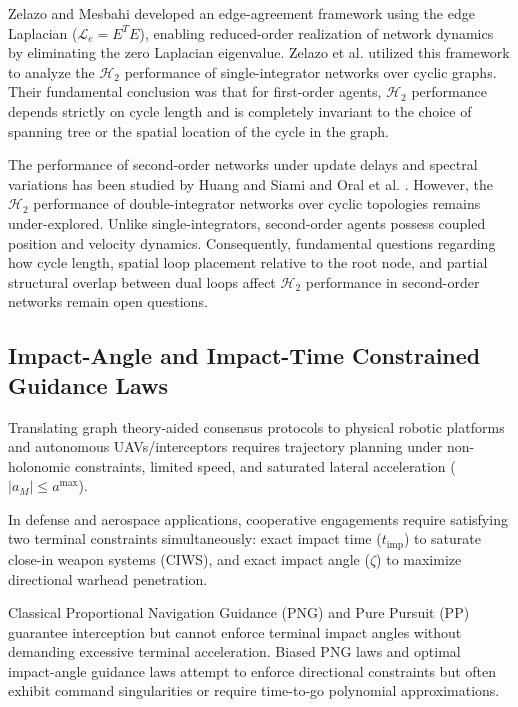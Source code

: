 Zelazo and Mesbahi \cite{zelazo2010edge} developed an edge-agreement framework using the edge Laplacian ($\mathcal{L}_e = E^T E$), enabling reduced-order realization of network dynamics by eliminating the zero Laplacian eigenvalue. Zelazo et al. \cite{zelazo2013performance} utilized this framework to analyze the $\mathcal{H}_2$ performance of single-integrator networks over cyclic graphs. Their fundamental conclusion was that for first-order agents, $\mathcal{H}_2$ performance depends strictly on cycle length and is completely invariant to the choice of spanning tree or the spatial location of the cycle in the graph.

The performance of second-order networks under update delays and spectral variations has been studied by Huang and Siami \cite{huang2022role} and Oral et al. \cite{oral2017performance}. However, the $\mathcal{H}_2$ performance of double-integrator networks over cyclic topologies remains under-explored. Unlike single-integrators, second-order agents possess coupled position and velocity dynamics. Consequently, fundamental questions regarding how cycle length, spatial loop placement relative to the root node, and partial structural overlap between dual loops affect $\mathcal{H}_2$ performance in second-order networks remain open questions.

\subsection{Impact-Angle and Impact-Time Constrained Guidance Laws}
Translating graph theory-aided consensus protocols to physical robotic platforms and autonomous UAVs/interceptors requires trajectory planning under non-holonomic constraints, limited speed, and saturated lateral acceleration ($|a_M| \le a^{\text{max}}$).

In defense and aerospace applications, cooperative engagements require satisfying two terminal constraints simultaneously: exact impact time ($t_{\text{imp}}$) to saturate close-in weapon systems (CIWS), and exact impact angle ($\zeta$) to maximize directional warhead penetration. 

Classical Proportional Navigation Guidance (PNG) \cite{SHNEYDOR1998101} and Pure Pursuit (PP) \cite{SHNEYDOR199847} guarantee interception but cannot enforce terminal impact angles without demanding excessive terminal acceleration. Biased PNG laws \cite{kim1998BPNG} and optimal impact-angle guidance laws \cite{Ryoo, ratnoo2009state} attempt to enforce directional constraints but often exhibit command singularities or require time-to-go polynomial approximations.

